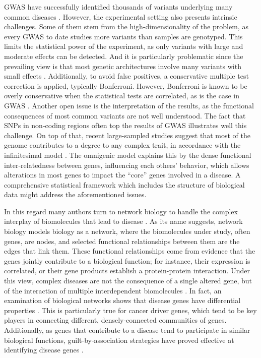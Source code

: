 \documentclass[twocolumn, 10pt]{article}
\begin{document}
GWAS have successfully identified thousands of variants underlying many common diseases \cite{buniello_nhgri-ebi_2019}. However, the experimental setting also presents intrinsic challenges. Some of them stem from the high-dimensionality of the problem, as every GWAS to date studies more variants than samples are genotyped. This limits the statistical power of the experiment, as only variants with large and moderate effects can be detected. And it is particularly problematic since the prevailing view is that most genetic architectures involve many variants with small effects \cite{visscher_10_2017}. Additionally, to avoid false positives, a conservative multiple test correction is applied, typically Bonferroni. However, Bonferroni is known to be overly conservative when the statistical tests are correlated, as is the case in GWAS \cite{wang_statistical_2018}. Another open issue is the interpretation of the results, as the functional consequences of most common variants are not well understood. The fact that SNPs in non-coding regions often top the results of GWAS illustrates well this challenge. On top of that, recent large-sampled studies suggest that most of the genome contributes to a degree to any complex trait, in accordance with the infinitesimal model \cite{barton_infinitesimal_2017}. The omnigenic model \cite{boyle_expanded_2017} explains this by the dense functional inter-relatedness between genes, influencing each others' behavior, which allows alterations in most genes to impact the ``core'' genes involved in a disease. A comprehensive statistical framework which includes the structure of biological data might address the aforementioned issues.

In this regard many authors turn to network biology to handle the complex interplay of biomolecules that lead to disease \cite{furlong_human_2013}. As its name suggests, network biology models biology as a network, where the biomolecules under study, often genes, are nodes, and selected functional relationships between them are the edges that link them. These functional relationships come from evidence that the genes jointly contribute to a biological function; for instance, their expression is correlated, or their gene products establish a protein-protein interaction. Under this view, complex diseases are not the consequence of a single altered gene, but of the interaction of multiple interdependent biomolecules \cite{barabasi_network_2011}. In fact, an examination of biological networks shows that disease genes have differential properties \cite{barabasi_network_2011} \cite{pinero_uncovering_2016}. This is particularly true for cancer driver genes, which tend to be key players in connecting different, densely-connected communities of genes. Additionally, as genes that contribute to a disease tend to participate in similar biological functions, guilt-by-association strategies have proved effective at identifying disease genes \cite{huang_systematic_2018}. 
\end{document}
